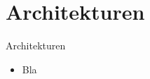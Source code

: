 \section{Architekturen}

\begin{slide}{Architekturen}
	\begin{itemize}
		\item Bla
	\end{itemize}
\end{slide}

